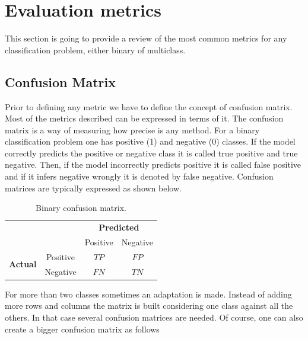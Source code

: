 \section{Evaluation metrics}\label{sec:metrics}

This section is going to provide a review of the most common metrics for any classification problem, either binary of multiclass. 

\subsection{Confusion Matrix}

Prior to defining any metric we have to define the concept of confusion matrix. Most of the metrics described can be expressed in terms of it. The confusion matrix is a way of measuring how precise is any method. For a binary classification problem one has positive (1) and negative (0) classes. If the model correctly predicts the positive or negative class it is called true positive and true negative. Then, if the model incorrectly predicts positive it is called false positive and if it infers negative wrongly it is denoted by false negative. Confusion matrices are typically expressed as shown below.

\begin{table}[ht]
\centering
\caption{Binary confusion matrix.}
\begin{tabular}{c c c|c|}
& & \multicolumn{2}{c}{\textbf{Predicted}} \\ \cline{3-4}
& & \multicolumn{1}{|c|}{Positive} & Negative \\ \cline{2-4}
\multirow{2}{*}{\textbf{Actual}} & \multicolumn{1}{|c|}{Positive} & $TP$ & $FP$ \\ \cline{2-4}
                     & \multicolumn{1}{|c|}{Negative} & $FN$ & $TN$ \\ \cline{2-4}
\end{tabular}
\label{table:confusion_matrix}
\end{table}

For more than two classes sometimes an adaptation is made. Instead of adding more rows and columns the matrix is built considering one class against all the others. In that case several confusion matrices are needed. Of course, one can also create a bigger confusion matrix as follows


